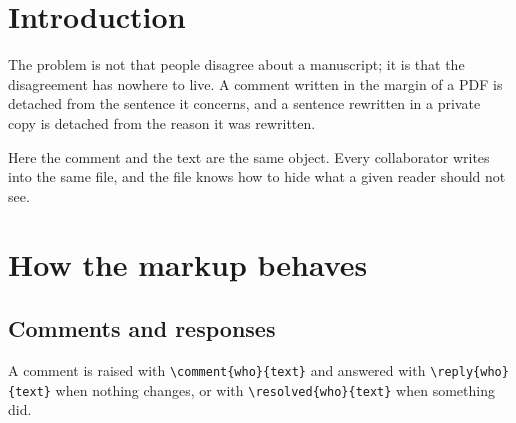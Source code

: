 
\begin{abstract}
Collaborative revision of a LaTeX manuscript usually degenerates into a folder
of files named \texttt{v3\_final\_JD\_comments\_REALfinal.tex}. This template
keeps a single source and derives three documents from it: the working master,
the comment-driven version circulated among collaborators, and the clean file
that goes to the journal.
\end{abstract}

\section{Introduction}

The problem is not that people disagree about a manuscript; it is that the
disagreement has nowhere to live. A comment written in the margin of a PDF is
detached from the sentence it concerns, and a sentence rewritten in a private
copy is detached from the reason it was rewritten.
%

Here the comment and the text are the same object. Every collaborator writes
into the same file, and the file knows how to hide what a given reader should
not see.

\section{How the markup behaves}

\subsection{Comments and responses}

A comment is raised with \verb|\comment{who}{text}| and answered with
\verb|\reply{who}{text}| when nothing changes, or with
\verb|\resolved{who}{text}| when something did.
%

